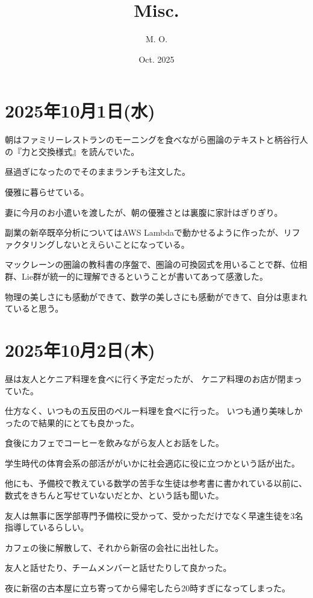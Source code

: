 \documentclass[uplatex]{jsarticle}
\title{
Misc.
}
\author{
M. O.
}
\date{Oct. 2025}
\begin{document}
\maketitle

\section{2025年10月1日(水)}

朝はファミリーレストランのモーニングを食べながら圏論のテキストと柄谷行人の『力と交換様式』を読んでいた。

昼過ぎになったのでそのままランチも注文した。

優雅に暮らせている。

妻に今月のお小遣いを渡したが、朝の優雅さとは裏腹に家計はぎりぎり。

副業の新卒既卒分析についてはAWS Lambdaで動かせるように作ったが、リファクタリングしないとえらいことになっている。

マックレーンの圏論の教科書の序盤で、圏論の可換図式を用いることで群、位相群、Lie群が統一的に理解できるということが書いてあって感激した。

物理の美しさにも感動ができて、数学の美しさにも感動ができて、自分は恵まれていると思う。





\section{2025年10月2日(木)}

昼は友人とケニア料理を食べに行く予定だったが、
ケニア料理のお店が閉まっていた。

仕方なく、いつもの五反田のペルー料理を食べに行った。
いつも通り美味しかったので結果的にとても良かった。

食後にカフェでコーヒーを飲みながら友人とお話をした。

学生時代の体育会系の部活ががいかに社会適応に役に立つかという話が出た。

他にも、予備校で教えている数学の苦手な生徒は参考書に書かれている以前に、数式をきちんと写せていないだとか、という話も聞いた。

友人は無事に医学部専門予備校に受かって、受かっただけでなく早速生徒を3名指導しているらしい。

カフェの後に解散して、それから新宿の会社に出社した。

友人と話せたり、チームメンバーと話せたりして良かった。

夜に新宿の古本屋に立ち寄ってから帰宅したら20時すぎになってしまった。
\end{document}
